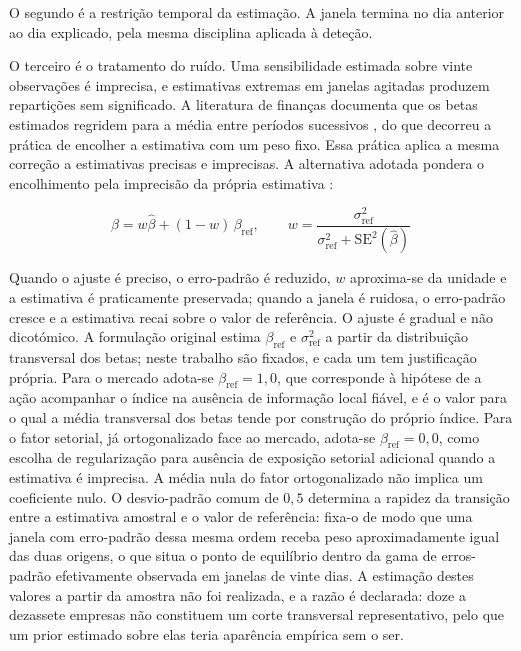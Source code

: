 O segundo é a restrição temporal da estimação. A janela termina no dia anterior ao dia explicado,
pela mesma disciplina aplicada à deteção.

O terceiro é o tratamento do ruído. Uma sensibilidade estimada sobre vinte observações é imprecisa,
e estimativas extremas em janelas agitadas produzem repartições sem significado. A literatura de
finanças documenta que os betas estimados regridem para a média entre períodos sucessivos
\autocite{blume1971risk}, do que decorreu a prática de encolher a estimativa com um peso fixo. Essa
prática aplica a mesma correção a estimativas precisas e imprecisas. A alternativa adotada pondera
o encolhimento pela imprecisão da própria estimativa \autocite{vasicek1973beta}:

\begin{equation}
\beta = w \hat{\beta} + (1-w)\,\beta_{\text{ref}}, \qquad w = \frac{\sigma^2_{\text{ref}}}{\sigma^2_{\text{ref}} + \mathrm{SE}^2(\hat{\beta})}
\label{eq:vasicek}
\end{equation}

Quando o ajuste é preciso, o erro-padrão é reduzido, $w$ aproxima-se da unidade e a estimativa é
praticamente preservada; quando a janela é ruidosa, o erro-padrão cresce e a estimativa recai sobre
o valor de referência. O ajuste é gradual e não dicotómico. A formulação original estima
$\beta_{\text{ref}}$ e $\sigma^2_{\text{ref}}$ a partir da distribuição transversal dos betas;
neste trabalho são fixados, e cada um tem justificação própria. Para o mercado adota-se
$\beta_{\text{ref}} = 1{,}0$, que corresponde à hipótese de a ação acompanhar o índice na ausência
de informação local fiável, e é o valor para o qual a média transversal dos betas tende por
construção do próprio índice. Para o fator setorial, já ortogonalizado face ao mercado, adota-se
$\beta_{\text{ref}} = 0{,}0$, como escolha de regularização para ausência de exposição setorial
adicional quando a estimativa é imprecisa. A média nula do fator ortogonalizado não implica um
coeficiente nulo. O desvio-padrão comum de $0{,}5$
determina a rapidez da transição entre a estimativa amostral e o valor de referência: fixa-o de
modo que uma janela com erro-padrão dessa mesma ordem receba peso aproximadamente igual das duas
origens, o que situa o ponto de equilíbrio dentro da gama de erros-padrão efetivamente observada em
janelas de vinte dias. A estimação destes valores a partir da amostra não foi realizada, e a razão
é declarada: doze a dezassete empresas não constituem um corte transversal representativo, pelo que
um prior estimado sobre elas teria aparência empírica sem o ser.

